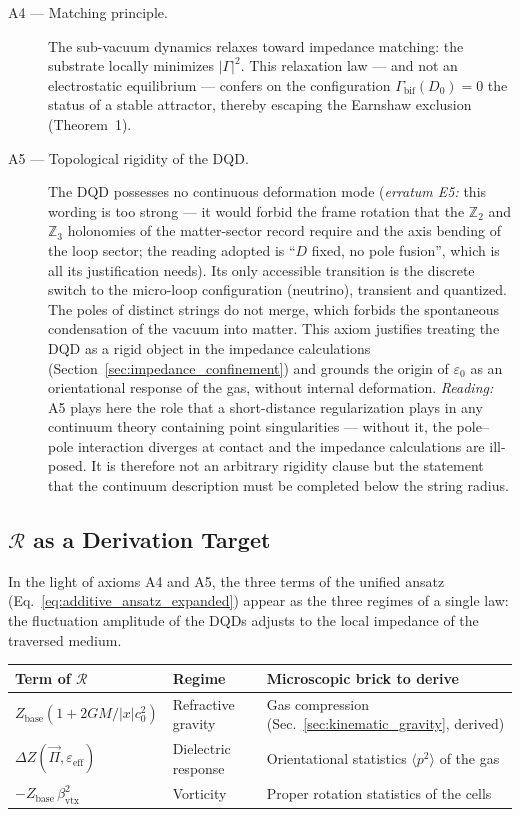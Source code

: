 \documentclass[11pt,a4paper]{article}
\theoremstyle{plain}
\theoremstyle{remark}
\begin{document}
\begin{description}
\item[A4 --- Matching principle.] The sub-vacuum dynamics relaxes toward impedance matching: the substrate locally minimizes $|\Gamma|^2$. This relaxation law --- and not an electrostatic equilibrium --- confers on the configuration $\Gamma_{\text{bif}}(D_0)=0$ the status of a stable attractor, thereby escaping the Earnshaw exclusion (Theorem~1).
\item[A5 --- Topological rigidity of the DQD.] The DQD possesses no continuous deformation mode (\emph{erratum E5:} this wording is too strong --- it would forbid the frame rotation that the $\mathbb{Z}_2$ and $\mathbb{Z}_3$ holonomies of the matter-sector record require and the axis bending of the loop sector; the reading adopted is ``$D$ fixed, no pole fusion'', which is all its justification needs). Its only accessible transition is the discrete switch to the micro-loop configuration (neutrino), transient and quantized. The poles of distinct strings do not merge, which forbids the spontaneous condensation of the vacuum into matter. This axiom justifies treating the DQD as a rigid object in the impedance calculations (Section~\ref{sec:impedance_confinement}) and grounds the origin of $\varepsilon_0$ as an orientational response of the gas, without internal deformation. \emph{Reading:} A5 plays here the role that a short-distance regularization plays in any continuum theory containing point singularities --- without it, the pole--pole interaction diverges at contact and the impedance calculations are ill-posed. It is therefore not an arbitrary rigidity clause but the statement that the continuum description must be completed below the string radius.
\end{description}

\subsection{$\mathcal{R}$ as a Derivation Target}

In the light of axioms A4 and A5, the three terms of the unified ansatz (Eq.~\ref{eq:additive_ansatz_expanded}) appear as the three regimes of a single law: the fluctuation amplitude of the DQDs adjusts to the local impedance of the traversed medium.

\begin{center}
\begin{tabular}{lll}
\toprule
\textbf{Term of $\mathcal{R}$} & \textbf{Regime} & \textbf{Microscopic brick to derive} \\
\midrule
$Z_{\text{base}}(1+2GM/|x|c_0^2)$ & Refractive gravity & Gas compression (Sec.~\ref{sec:kinematic_gravity}, derived) \\
$\Delta Z(\vec{\Pi},\varepsilon_{\text{eff}})$ & Dielectric response & Orientational statistics $\langle p^2\rangle$ of the gas \\
$-Z_{\text{base}}\,\beta_{\text{vtx}}^2$ & Vorticity & Proper rotation statistics of the cells \\
\bottomrule
\end{tabular}
\end{center}
\end{document}
